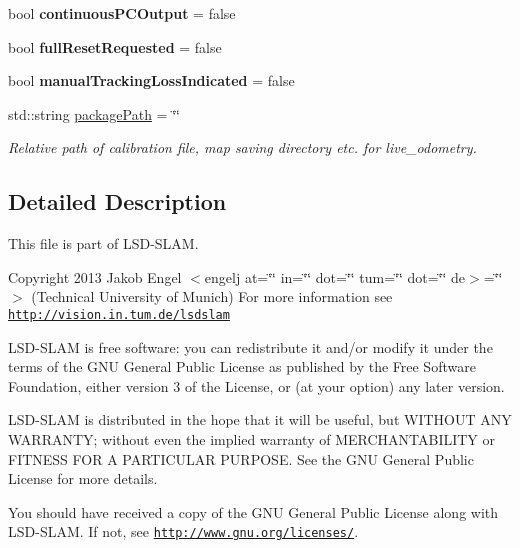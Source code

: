 \begin{DoxyCompactItemize}
\item 
\hypertarget{namespacelsd__slam_a2d1d49aebac24972020190f03db39a18}{bool {\bfseries continuous\-P\-C\-Output} = false}\label{namespacelsd__slam_a2d1d49aebac24972020190f03db39a18}

\item 
\hypertarget{namespacelsd__slam_af270ce8c304c38f8628443c03f8f2d1e}{bool {\bfseries full\-Reset\-Requested} = false}\label{namespacelsd__slam_af270ce8c304c38f8628443c03f8f2d1e}

\item 
\hypertarget{namespacelsd__slam_ae98b391be2481407ecc3102a16c6389b}{bool {\bfseries manual\-Tracking\-Loss\-Indicated} = false}\label{namespacelsd__slam_ae98b391be2481407ecc3102a16c6389b}

\item 
\hypertarget{namespacelsd__slam_a9cdacc7470f016e531db61e1d26c114e}{std\-::string \hyperlink{namespacelsd__slam_a9cdacc7470f016e531db61e1d26c114e}{package\-Path} = \char`\"{}\char`\"{}}\label{namespacelsd__slam_a9cdacc7470f016e531db61e1d26c114e}

\begin{DoxyCompactList}\small\item\em Relative path of calibration file, map saving directory etc. for live\-\_\-odometry. \end{DoxyCompactList}\end{DoxyCompactItemize}


\subsection{Detailed Description}
This file is part of L\-S\-D-\/\-S\-L\-A\-M.

Copyright 2013 Jakob Engel $<$engelj at=\char`\"{}\char`\"{} in=\char`\"{}\char`\"{} dot=\char`\"{}\char`\"{} tum=\char`\"{}\char`\"{} dot=\char`\"{}\char`\"{} de$>$=\char`\"{}\char`\"{}$>$ (Technical University of Munich) For more information see \href{http://vision.in.tum.de/lsdslam}{\tt http\-://vision.\-in.\-tum.\-de/lsdslam}

L\-S\-D-\/\-S\-L\-A\-M is free software\-: you can redistribute it and/or modify it under the terms of the G\-N\-U General Public License as published by the Free Software Foundation, either version 3 of the License, or (at your option) any later version.

L\-S\-D-\/\-S\-L\-A\-M is distributed in the hope that it will be useful, but W\-I\-T\-H\-O\-U\-T A\-N\-Y W\-A\-R\-R\-A\-N\-T\-Y; without even the implied warranty of M\-E\-R\-C\-H\-A\-N\-T\-A\-B\-I\-L\-I\-T\-Y or F\-I\-T\-N\-E\-S\-S F\-O\-R A P\-A\-R\-T\-I\-C\-U\-L\-A\-R P\-U\-R\-P\-O\-S\-E. See the G\-N\-U General Public License for more details.

You should have received a copy of the G\-N\-U General Public License along with L\-S\-D-\/\-S\-L\-A\-M. If not, see \href{http://www.gnu.org/licenses/}{\tt http\-://www.\-gnu.\-org/licenses/}. 